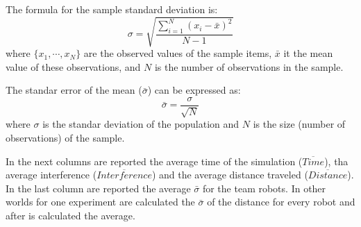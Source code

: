 The formula for the sample standard deviation is:
\[ \sigma={\sqrt {\frac {\sum _{i=1}^{N}(x_{i}-{\bar {x}})^{2}}{N-1}}} \]
where $\{x_1, \cdots, x_N\}$ are the observed values of the sample items, $\bar{x}$ it the mean value of these observations, 
and $N$ is the number of observations in the sample. 

The standar error of the mean ($\bar{\sigma}$) can be expressed as:
\[\bar{\sigma} ={\frac {\sigma }{\sqrt {N}}}\]
where $\sigma$ is the standar deviation of the population and $N$ is the size (number of observations) of the sample.

In the next columns are reported the average time of the simulation  ($\overline{Time}$), tha average interference ($\overline{Interference}$) and the average distance traveled ($\overline{Distance}$).
In the last column are reported the average $\bar{\sigma}$ for the team robots. In other worlds for one experiment are 
calculated the $\bar{\sigma}$ of the distance for every robot and after is calculated the average.   

